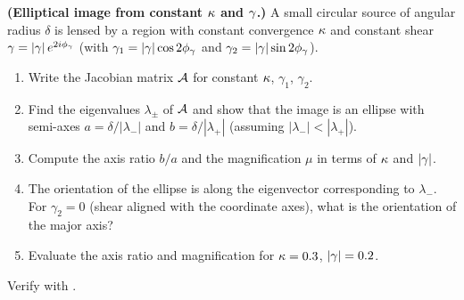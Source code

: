 \begin{exercise}
\label{ex:elliptical_image}
\textbf{(Elliptical image from constant $\kappa$ and $\gamma$.)}
A small circular source of angular radius $\delta$ is lensed by a
region with constant convergence $\kappa$ and constant shear
$\gamma = |\gamma|\,e^{2i\phi_\gamma}$ (with $\gamma_1 =
|\gamma|\cos 2\phi_\gamma$ and $\gamma_2 = |\gamma|\sin 2\phi_\gamma$).
\begin{enumerate}[label=(\alph*)]
    \item Write the Jacobian matrix $\mathcal{A}$ for constant $\kappa$,
          $\gamma_1$, $\gamma_2$.
    \item Find the eigenvalues $\lambda_\pm$ of $\mathcal{A}$ and show
          that the image is an ellipse with semi-axes
          $a = \delta/|\lambda_-|$ and $b = \delta/|\lambda_+|$
          (assuming $|\lambda_-| < |\lambda_+|$).
    \item Compute the axis ratio $b/a$ and the magnification $\mu$
          in terms of $\kappa$ and $|\gamma|$.
    \item The orientation of the ellipse is along the eigenvector
          corresponding to $\lambda_-$.  For $\gamma_2 = 0$
          (shear aligned with the coordinate axes), what is the
          orientation of the major axis?
    \item Evaluate the axis ratio and magnification for
          $\kappa = 0.3$, $|\gamma| = 0.2$.
\end{enumerate}
Verify with
.
\end{exercise}
